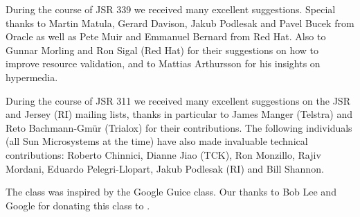 During the course of JSR 339 we received many excellent suggestions. Special thanks to Martin Matula, Gerard Davison, Jakub Podlesak and Pavel Bucek from Oracle as well as Pete Muir and Emmanuel Bernard from Red Hat. Also to Gunnar Morling and Ron Sigal (Red Hat) for their suggestions on how to improve resource validation, and to Mattias Arthursson for his insights on hypermedia.

During the course of JSR 311 we received many excellent suggestions on the JSR and Jersey (RI) mailing lists, thanks in particular to James Manger (Telstra) and Reto Bachmann-Gm\"{u}r (Trialox) for their contributions. The following individuals (all Sun Microsystems at the time) have also made invaluable technical contributions: Roberto Chinnici, Dianne Jiao (TCK), Ron Monzillo, Rajiv Mordani, Eduardo Pelegri-Llopart, Jakub Podlesak (RI) and Bill Shannon. 

The  class was inspired by the Google Guice  class. Our thanks to Bob Lee and Google for donating this class to \jaxrs. 
